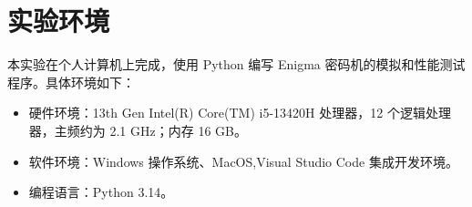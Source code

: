 \section{实验环境}

本实验在个人计算机上完成，使用 Python 编写 Enigma 密码机的模拟和性能测试程序。具体环境如下：

\begin{itemize}
    \item 硬件环境：13th Gen Intel(R) Core(TM) i5-13420H 处理器，12 个逻辑处理器，主频约为 2.1 GHz；内存 16 GB。
    \item 软件环境：Windows 操作系统、MacOS,Visual Studio Code 集成开发环境。
    \item 编程语言：Python 3.14。
\end{itemize}
